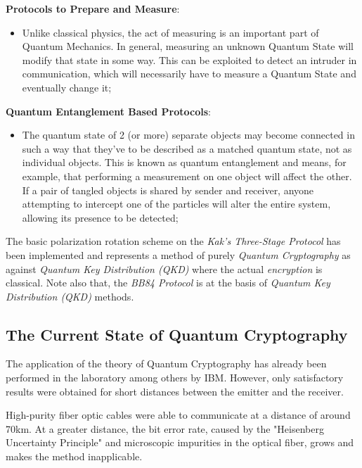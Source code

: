 \documentclass[conference]{IEEEtran}
\begin{document}
\vspace{4pt}

\textbf{Protocols to Prepare and Measure}:

\begin{itemize}
    \item Unlike classical physics, the act of measuring is an important part of Quantum Mechanics. In general, measuring an unknown Quantum State will modify that state in some way. This can be exploited to detect an intruder in communication, which will necessarily have to measure a Quantum State and eventually change it;
\end{itemize}

\textbf{Quantum Entanglement Based Protocols}:

\begin{itemize}
    \item The quantum state of 2 (or more) separate objects may become connected in such a way that they've to be described as a matched quantum state, not as individual objects. This is known as quantum entanglement and means, for example, that performing a measurement on one object will affect the other. If a pair of tangled objects is shared by sender and receiver, anyone attempting to intercept one of the particles will alter the entire system, allowing its presence to be detected;
\end{itemize}

The basic polarization rotation scheme on the \textit{Kak's Three-Stage Protocol} has been implemented and represents a method of purely \textit{Quantum Cryptography} as against \textit{Quantum Key Distribution (QKD)} where the actual \textit{encryption} is classical. Note also that, the \textit{BB84 Protocol} is at the basis of \textit{Quantum Key Distribution (QKD)} methods.

\newpage

\subsection{The Current State of Quantum Cryptography}

The application of the theory of Quantum Cryptography has already been performed in the laboratory among others by IBM. However, only satisfactory results were obtained for short distances between the emitter and the receiver.

\vspace{4pt}

High-purity fiber optic cables were able to communicate at a distance of around 70km. At a greater distance, the bit error rate, caused by the "Heisenberg Uncertainty Principle" and microscopic impurities in the optical fiber, grows and makes the method inapplicable.
\end{document}
